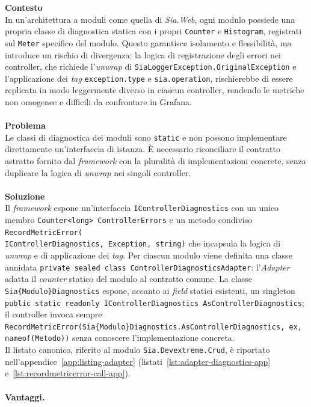 \textbf{Contesto}\\
In un'architettura a moduli come quella di \emph{Sia.Web}, ogni modulo
possiede una propria classe di diagnostica statica con i propri
\texttt{Counter} e \texttt{Histogram}, registrati sul \texttt{Meter}
specifico del modulo. Questo garantisce isolamento e flessibilità, ma
introduce un rischio di divergenza: la logica di registrazione degli errori
nei controller, che richiede l'\emph{unwrap} di
\texttt{SiaLoggerException.OriginalException} e l'applicazione dei \emph{tag}
\texttt{exception.type} e \texttt{sia.operation}, rischierebbe di essere
replicata in modo leggermente diverso in ciascun controller, rendendo le
metriche non omogenee e difficili da confrontare in Grafana.\\
\\\textbf{Problema}\\
Le classi di diagnostica dei moduli sono \texttt{static} e non possono
implementare direttamente un'interfaccia di istanza. È necessario
riconciliare il contratto astratto fornito dal \emph{framework} con la
pluralità di implementazioni concrete, senza duplicare la logica di
\emph{unwrap} nei singoli controller.\\
\\\textbf{Soluzione}\\
Il \emph{framework} espone un'interfaccia
\texttt{IControllerDiagnostics} con un unico membro
\texttt{Counter<long> ControllerErrors} e un metodo condiviso
\texttt{RecordMetricError(\\IControllerDiagnostics, Exception, string)}
che incapsula la logica di \emph{unwrap} e di applicazione dei \emph{tag}.
Per ciascun modulo viene definita una classe annidata
\texttt{private sealed class ControllerDiagnosticsAdapter}: l'\emph{Adapter}
adatta il \emph{counter} statico del modulo al contratto comune. La classe
\texttt{Sia\{Modulo\}Diagnostics} espone, accanto ai \emph{field} statici
esistenti, un singleton
\texttt{public static readonly IControllerDiagnostics AsControllerDiagnostics};
il controller invoca sempre
\texttt{RecordMetricError(Sia\{Modulo\}Diagnostics.AsControllerDiagnostics, ex,\\ nameof(Metodo))}
senza conoscere l'implementazione concreta.\\
Il listato canonico, riferito al modulo \texttt{Sia.Devextreme.Crud}, è
riportato nell'appendice~\ref{app:listing-adapter}
(listati~\ref{lst:adapter-diagnostics-app} e~\ref{lst:recordmetricerror-call-app}).\\
\\\textbf{Vantaggi.}
